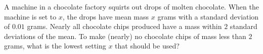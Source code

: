 A machine in a chocolate factory squirts out drops of molten chocolate. When the machine is set to $x$, the drops have mean mass $x$ grams with a standard deviation of $0.01$ grams. Nearly all chocolate chips produced have a mass within $2$ standard deviations of the mean. To make (nearly) no chocolate chips of mass less than $2$ grams, what is the lowest setting $x$ that should be used?
